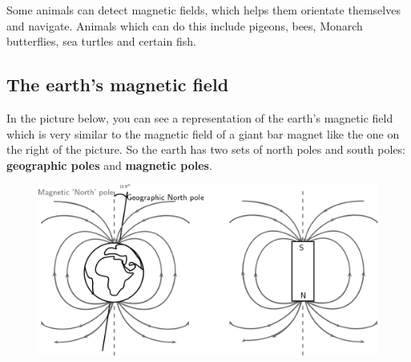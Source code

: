     \addtocounter{footnote}{-0}
    
      \par 
      \label{m37830*id128241}Some animals can detect magnetic fields, which
helps them orientate themselves and navigate. Animals which can do this include pigeons, bees, Monarch
butterflies, sea turtles and certain fish.\par 
      \label{m37830*uid22}
            \subsection{ The earth's magnetic field}
            \nopagebreak
            
        
        \label{m37830*id128255}In the picture below, you can see a representation of the earth's magnetic
field which is very similar to the magnetic field of a giant bar magnet like
the one on the right of the picture. So the earth has two sets of north poles
and south poles: \textbf{geographic poles} and \textbf{magnetic poles}.\par 
        \label{m37830*id128272}
          
    \setcounter{subfigure}{0}


	\begin{figure}[H] %
    \begin{center}
    \label{m37830*id128275!!!underscore!!!media}\label{m37830*id128275!!!underscore!!!printimage}\includegraphics[width=\columnwidth]{col11305.imgs/m37830_PG10C7_016.png} %
        
      \vspace{2pt}
    \vspace{.1in}
    
    \end{center}

 \end{figure}   

